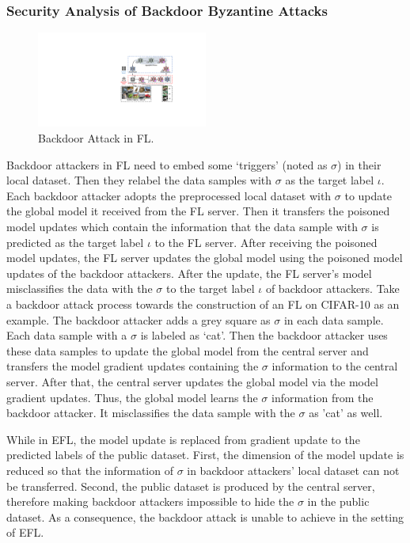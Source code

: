 \documentclass[journal]{IEEEtran}
\begin{document}
\subsubsection{Security Analysis of Backdoor Byzantine Attacks}
\begin{figure}
\centering
\includegraphics[width=0.5\textwidth]{figures/Figure_backdoor.pdf}
\caption{Backdoor Attack in FL.}
\label{fig_backdoor}
\end{figure}
\par Backdoor attackers in FL need to embed some `triggers' (noted as $\sigma$) in their local dataset. Then they relabel the data samples with $\sigma$ as the target label $\iota$. Each backdoor attacker adopts the preprocessed local dataset with $\sigma$ to update the global model it received from the FL server. Then it transfers the poisoned model updates which contain the information that the data sample with $\sigma$ is predicted as the target label $\iota$ to the FL server. After receiving the poisoned model updates, the FL server updates the global model using the poisoned model updates of the backdoor attackers. After the update, the FL server's model misclassifies the data with the $\sigma$ to the target label $\iota$ of backdoor attackers. Take a backdoor attack process towards the construction of an FL on CIFAR-10 as an example. The backdoor attacker adds a grey square as $\sigma$ in each data sample. Each data sample with a $\sigma$ is labeled as `cat'. Then the backdoor attacker uses these data samples to update the global model from the central server and transfers the model gradient updates containing the $\sigma$ information to the central server. After that, the central server updates the global model via the model gradient updates. Thus, the global model learns the $\sigma$ information from the backdoor attacker. It misclassifies the data sample with the $\sigma$ as 'cat' as well.
\par While in EFL, the model update is replaced from gradient update to the predicted labels of the public dataset. First, the dimension of the model update is reduced so that the information of $\sigma$ in backdoor attackers' local dataset can not be transferred. Second, the public dataset is produced by the central server, therefore making backdoor attackers impossible to hide the $\sigma$ in the public dataset. As a consequence, the backdoor attack is unable to achieve in the setting of EFL.
\end{document}
